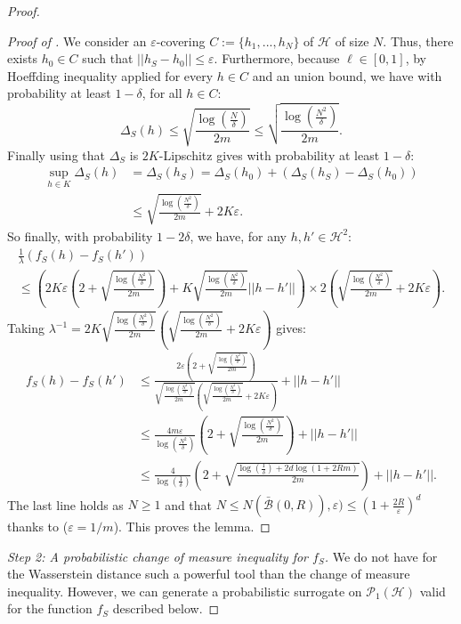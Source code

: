 \begin{noaddcontents}
\begin{proof}
\begin{proof}[Proof of ]
We consider an $\varepsilon$-covering $C:=\{h_1,...,h_N\}$ of $\mathcal{H}$ of size $N$.
Thus, there exists $h_0\in C$ such that $||h_S- h_0||\leq \varepsilon$.
Furthermore, because $\ell \in [0,1]$, by Hoeffding inequality applied for every $h\in C$ and an union bound, we have with probability at least $1-\delta$, for all $h\in C$:
\[ \Delta_S(h) \leq  \sqrt{\frac{\log(\frac{N}{\delta})}{2m}} \leq   \sqrt{\frac{\log(\frac{N^2}{\delta})}{2m}}. \]
Finally using that $\Delta_S$ is $2K$-Lipschitz gives with probability at least $1-\delta$:
\begin{align*}
\sup_{h\in K} \Delta_S(h) &= \Delta_S(h_S) = \Delta_S(h_0) + \left(\Delta_S(h_S)- \Delta_S(h_0)  \right) \\
& \leq  \sqrt{\frac{\log(\frac{N^2}{\delta})}{2m}} + 2K\varepsilon.
\end{align*}
So finally, with probability $1- 2\delta$, we have, for any $h,h'\in \mathcal{H}^2$:
\begin{multline*}
\frac{1}{\lambda} \left(f_S(h)-f_S(h') \right) \\ \leq \left(2K\varepsilon\left( 2 + \sqrt{\frac{\log\left(\frac{N^2}{\delta}\right)}{2m}}  \right) +  K\sqrt{\frac{\log\left(\frac{N^2}{\delta}\right)}{2m}}||h-h'|| \right)\times
2\left( \sqrt{\frac{\log(\frac{N^2}{\delta})}{2m}} + 2K\varepsilon \right).
\end{multline*}
Taking $\lambda^{-1}=  2K\sqrt{\frac{\log(\frac{N^2}{\delta})}{2m}}\left(\sqrt{\frac{\log(\frac{N^2}{\delta})}{2m}} + 2K\varepsilon \right)$ gives:
\begin{align*}
f_S(h)-f_S(h')  & \leq \frac{2\varepsilon\left( 2 + \sqrt{\frac{\log\left(\frac{N^2}{\delta}\right)}{2m}}  \right)}{\sqrt{\frac{\log(\frac{N^2}{\delta})}{2m}}\left(\sqrt{\frac{\log(\frac{N^2}{\delta})}{2m}} + 2K\varepsilon \right)} + ||h-h'||\\
& \leq \frac{4m\varepsilon}{\log\left(\frac{N^2}{\delta}\right)} \left( 2 + \sqrt{\frac{\log\left(\frac{N^2}{\delta}\right)}{2m}}  \right) + ||h-h'|| \\
& \leq \frac{4}{\log(\frac{1}{\delta})} \left( 2 + \sqrt{\frac{\log\left(\frac{1}{\delta}\right) + 2d\log(1+2Rm)}{2m}}  \right) + ||h-h'||.
\end{align*}
The last line holds as $N\geq1$ and that $N\leq N(\bar{\mathcal{B}}(0,R)), \varepsilon) \leq \left(1+\frac{2R}{\varepsilon}\right)^d$ thanks to  ($\varepsilon = 1/m$).
This proves the lemma.
\end{proof}

\textit{Step 2: A probabilistic change of measure inequality for $f_S$.}
We do not have for the Wasserstein distance such a powerful tool than the change of measure inequality. However, we can generate a probabilistic surrogate on $\mathcal{P}_1(\mathcal{H})$ valid for the function $f_S$ described below.


\end{proof}
\end{noaddcontents}
